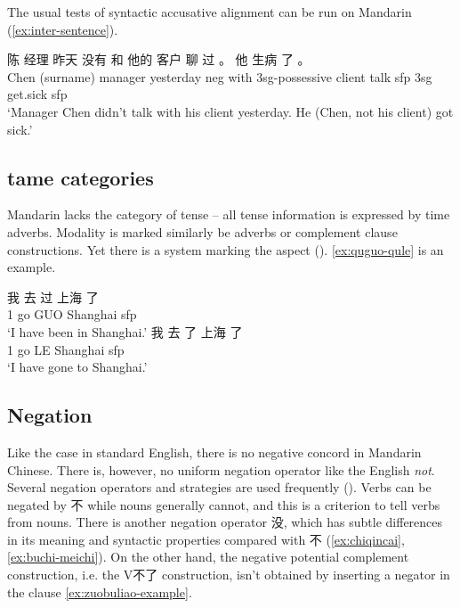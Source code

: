 \documentclass[UTF8, a4paper, oneside, scheme=plain]{ctexrep}
\newcommand{\translate}[1]{`#1'}
\begin{document}
The usual tests of syntactic accusative alignment can be run on Mandarin
(\ref{ex:inter-sentence}).

\begin{exe}
    \ex \gll 陈 经理 昨天 没有 和 他的 客户 聊 过 。 他 生病 了 。 \\
    {Chen (surname)} manager yesterday \acs{neg} with 3sg-\acs{possessive} client talk \acs{sfp}
    {} 3sg get.sick \acs{sfp} \\
    \glt \translate{Manager Chen didn't talk with his client yesterday. He (Chen, not his client) got sick.}
    \label{ex:inter-sentence}
\end{exe}

\subsection{\acs{tame} categories}

Mandarin lacks the category of tense -- 
all tense information is expressed by time adverbs.
Modality is marked similarly be adverbs or complement clause constructions.
Yet there is a system marking the aspect (). 
\eqref{ex:quguo-qule} is an example.

\begin{exe}
    \ex \begin{xlist}
        \ex \gll 我 去 过 上海 了 \\
        1 go GUO Shanghai \acs{sfp} \\
        \glt \translate{I have been in Shanghai.}
        \ex \gll 我 去 了 上海 了 \\
        1 go LE Shanghai \acs{sfp} \\
        \glt \translate{I have gone to Shanghai.}
    \end{xlist}
    \label{ex:quguo-qule}
\end{exe}

\subsection{Negation}

Like the case in standard English, 
there is no negative concord in Mandarin Chinese.
There is, however, no uniform negation operator like the English \emph{not}. 
Several negation operators and strategies are used frequently ().
Verbs can be negated by 不 while nouns generally cannot, 
and this is a criterion to tell verbs from nouns. 
There is another negation operator 没, 
which has subtle differences in its meaning and syntactic properties compared with 不
(\ref{ex:chiqincai}, \ref{ex:buchi-meichi}).
On the other hand, the negative potential complement construction,
i.e. the V不了 construction,
isn't obtained by inserting a negator in the clause \eqref{ex:zuobuliao-example}.
\end{document}
